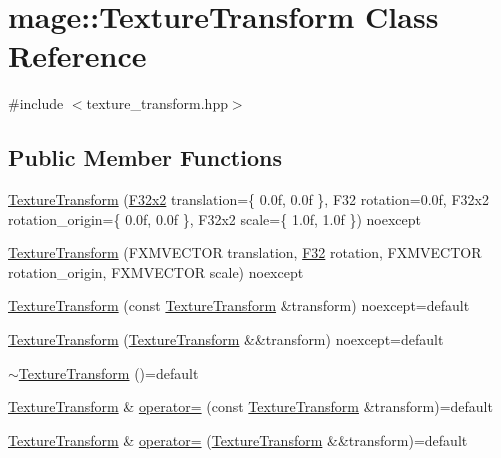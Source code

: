 \hypertarget{classmage_1_1_texture_transform}{}\section{mage\+:\+:Texture\+Transform Class Reference}
\label{classmage_1_1_texture_transform}


{\ttfamily \#include $<$texture\+\_\+transform.\+hpp$>$}

\subsection*{Public Member Functions}
\begin{DoxyCompactItemize}
\item 
\hyperlink{classmage_1_1_texture_transform_ab473e1998fac7a7d03093d9e7f6ad210}{Texture\+Transform} (\hyperlink{namespacemage_aa87237ad091f5cd7da612b8523fc108f}{F32x2} translation=\{ 0.\+0f, 0.\+0f \}, F32 rotation=0.\+0f, F32x2 rotation\+\_\+origin=\{ 0.\+0f, 0.\+0f \}, F32x2 scale=\{ 1.\+0f, 1.\+0f \}) noexcept
\item 
\hyperlink{classmage_1_1_texture_transform_aab4c14bc8bca53e7cd7bed33a9cb45e4}{Texture\+Transform} (F\+X\+M\+V\+E\+C\+T\+OR translation, \hyperlink{namespacemage_aa97e833b45f06d60a0a9c4fc22ae02c0}{F32} rotation, F\+X\+M\+V\+E\+C\+T\+OR rotation\+\_\+origin, F\+X\+M\+V\+E\+C\+T\+OR scale) noexcept
\item 
\hyperlink{classmage_1_1_texture_transform_a7b3cd0015adefa9cf8475f55bb83764a}{Texture\+Transform} (const \hyperlink{classmage_1_1_texture_transform}{Texture\+Transform} \&transform) noexcept=default
\item 
\hyperlink{classmage_1_1_texture_transform_a37e8d4155e7c2bd4e8ebf282c855e2ae}{Texture\+Transform} (\hyperlink{classmage_1_1_texture_transform}{Texture\+Transform} \&\&transform) noexcept=default
\item 
\hyperlink{classmage_1_1_texture_transform_afb608ccc7bc107b893ea68937529a901}{$\sim$\+Texture\+Transform} ()=default
\item 
\hyperlink{classmage_1_1_texture_transform}{Texture\+Transform} \& \hyperlink{classmage_1_1_texture_transform_a0166da366dcf3054db133dda5867cf87}{operator=} (const \hyperlink{classmage_1_1_texture_transform}{Texture\+Transform} \&transform)=default
\item 
\hyperlink{classmage_1_1_texture_transform}{Texture\+Transform} \& \hyperlink{classmage_1_1_texture_transform_a82adfc646b3467f33d92f7f2e24bf28e}{operator=} (\hyperlink{classmage_1_1_texture_transform}{Texture\+Transform} \&\&transform)=default

\end{DoxyCompactItemize}
